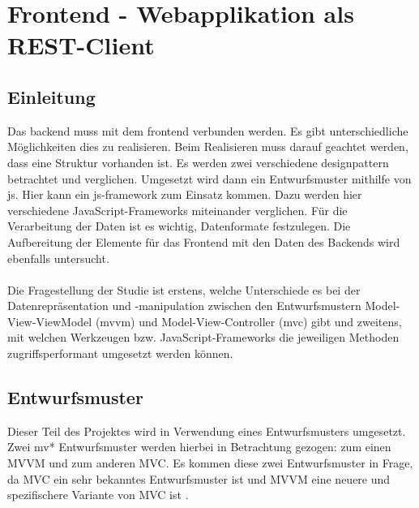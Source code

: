 
\section{Frontend - Webapplikation als REST-Client}
\label{chapter:study-datenschnittstelle}
\subsection{Einleitung}
Das \Gls{backend} muss mit dem \Gls{frontend} verbunden werden. Es gibt unterschiedliche Möglichkeiten dies zu realisieren. Beim Realisieren muss darauf geachtet werden, dass eine Struktur vorhanden ist. Es werden zwei verschiedene \Gls{designpattern} betrachtet und verglichen. Umgesetzt wird dann ein Entwurfsmuster mithilfe von \Gls{js}. Hier kann ein \Gls{js}-\Gls{framework} zum Einsatz kommen. Dazu werden hier verschiedene JavaScript-Frameworks miteinander verglichen. Für die Verarbeitung der Daten ist es wichtig, Datenformate festzulegen. Die Aufbereitung der Elemente für das Frontend mit den Daten des Backends wird ebenfalls untersucht.
\\\\
Die Fragestellung der Studie ist erstens, welche Unterschiede es bei der Datenrepräsentation und -manipulation zwischen den Entwurfsmustern Model-View-ViewModel (\Gls{mvvm}) und Model-View-Controller (\Gls{mvc}) gibt und zweitens, mit welchen Werkzeugen bzw. JavaScript-Frameworks die jeweiligen Methoden zugriffsperformant umgesetzt werden können.
\subsection{Entwurfsmuster}
Dieser Teil des Projektes wird in Verwendung eines Entwurfsmusters umgesetzt. Zwei \Gls{mv*} Entwurfsmuster werden hierbei in Betrachtung gezogen: zum einen MVVM und zum anderen MVC. Es kommen diese zwei Entwurfsmuster in Frage, da MVC ein sehr bekanntes Entwurfsmuster ist und MVVM eine neuere und spezifischere Variante von MVC ist \cite{mvvm_vue}.
